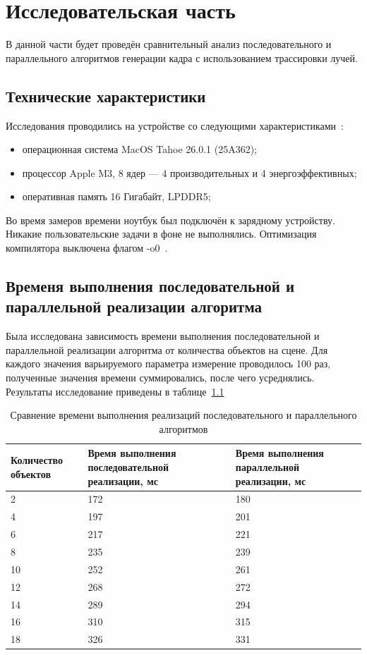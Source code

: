 \chapter{Исследовательская часть}

В данной части будет проведён сравнительный анализ последовательного и параллельного алгоритмов генерации кадра с использованием трассировки лучей.

\section{Технические характеристики}
Исследования проводились на устройстве со следующими характеристиками~\cite{macbook_spec}:
\begin{itemize}
	\item операционная система MacOS Tahoe 26.0.1 (25A362);
	\item процессор Apple M3, 8 ядер --- 4 производительных и 4 энергоэффективных;
	\item оперативная память 16 Гигабайт, LPDDR5;
\end{itemize}
Во время замеров времени ноутбук был подключён к зарядному устройству. Никакие пользовательские задачи в фоне не выполнялись. Оптимизация компилятора выключена флагом -o0~\cite{compilator_level_optimize}.

\section{Временя выполнения последовательной и параллельной реализации алгоритма}

Была исследована зависимость времени выполнения последовательной и параллельной реализации алгоритма от количества объектов на сцене. Для каждого значения варьируемого параметра измерение проводилось 100 раз, полученные значения времени суммировались, после чего усреднялись. Результаты исследование приведены в таблице~\ref{tab:res_1} 

\begin{table}[H]
	\centering
	\caption{Сравнение времени выполнения реализаций последовательного и параллельного алгоритмов}
	\label{tab:res_1}
	\begin{tabular}{|p{5cm}|p{5.65cm}|p{5.05cm}|}
		\hline
		\textbf{Количество объектов} & \textbf{Время выполнения последовательной реализации, мс} & \textbf{Время выполнения параллельной реализации, мс} \\
		\hline 2  & 172 & 180 \\
		\hline 4  & 197 & 201 \\
		\hline 6  & 217 & 221 \\
		\hline 8  & 235 & 239 \\
		\hline 10 & 252 & 261 \\
		\hline 12 & 268 & 272 \\
		\hline 14 & 289 & 294 \\
		\hline 16 & 310 & 315 \\
		\hline 18 & 326 & 331 \\
		\hline
	\end{tabular}
\end{table}

